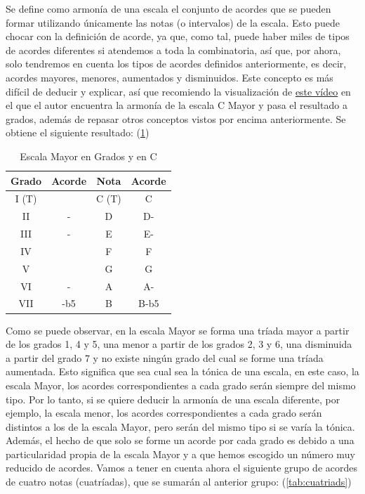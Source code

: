 \label{arm:armonia_escala}
Se define como armonía de una escala el conjunto de acordes que se pueden formar utilizando únicamente las notas (o intervalos) de la escala. Esto puede chocar con la definición de acorde, ya que, como tal, puede haber miles de tipos de acordes diferentes si atendemos a toda la combinatoria, así que, por ahora, solo tendremos en cuenta los tipos de acordes definidos anteriormente, es decir, acordes mayores, menores, aumentados y disminuidos. Este concepto es más difícil de deducir y explicar, así que recomiendo la visualización de \href{https://www.youtube.com/watch?v=dMwVB3BWcjI}{este vídeo} en el que el autor encuentra la armonía de la escala C Mayor y pasa el resultado a grados, además de repasar otros conceptos vistos por encima anteriormente. Se obtiene el siguiente resultado: (\ref{tab:grados_C})

\begin{table}[h]
    \centering
    \begin{tabular}{c|c||c|c}
        \textbf{Grado} & \textbf{Acorde} & \textbf{Nota} & \textbf{Acorde} \\
        \hline
        I (T) &  & C (T) & C \\
        II & - & D & D- \\
        III & - & E & E- \\
        IV &  & F & F \\
        V &  & G & G \\
        VI & - & A & A- \\
        VII & -b5 & B & B-b5 \\
    \end{tabular}
    \caption{Escala Mayor en Grados y en C}
    \label{tab:grados_C}
\end{table}

Como se puede observar, en la escala Mayor se forma una tríada mayor a partir de los grados 1, 4 y 5, una menor a partir de los grados 2, 3 y 6, una disminuida a partir del grado 7 y no existe ningún grado del cual se forme una tríada aumentada. Esto significa que sea cual sea la tónica de una escala, en este caso, la escala Mayor, los acordes correspondientes a cada grado serán siempre del mismo tipo. Por lo tanto, si se quiere deducir la armonía de una escala diferente, por ejemplo, la escala menor, los acordes correspondientes a cada grado serán distintos a los de la escala Mayor, pero serán del mismo tipo si se varía la tónica. Además, el hecho de que solo se forme un acorde por cada grado es debido a una particularidad propia de la escala Mayor y a que hemos escogido un número muy reducido de acordes. Vamos a tener en cuenta ahora el siguiente grupo de acordes de cuatro notas (cuatríadas), que se sumarán al anterior grupo: (\ref{tab:cuatriads})

